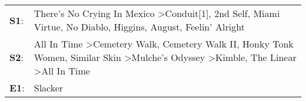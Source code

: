 \begin{supertabular}{p{0.03\textwidth}p{0.92\textwidth}}
 \textbf{S1}:  &                                                                                    There's No Crying In Mexico\textsuperscript{} \textgreater \enspace Conduit[1]\textsuperscript{}, \enspace 2nd Self\textsuperscript{}, \enspace Miami Virtue\textsuperscript{}, \enspace No Diablo\textsuperscript{}, \enspace Higgins\textsuperscript{}, \enspace August\textsuperscript{}, \enspace Feelin' Alright\textsuperscript{}  \enspace  \\
 \textbf{S2}:  &  All In Time\textsuperscript{} \textgreater \enspace Cemetery Walk\textsuperscript{}, \enspace Cemetery Walk II\textsuperscript{}, \enspace Honky Tonk Women\textsuperscript{}, \enspace Similar Skin\textsuperscript{} \textgreater \enspace Mulche's Odyssey\textsuperscript{} \textgreater \enspace Kimble\textsuperscript{}, \enspace The Linear\textsuperscript{} \textgreater \enspace All In Time\textsuperscript{}  \enspace  \\
 \textbf{E1}:  &                                                                                                                                                                                                                                                                                                                                                                                                  Slacker\textsuperscript{}  \enspace  \\
\end{supertabular}
